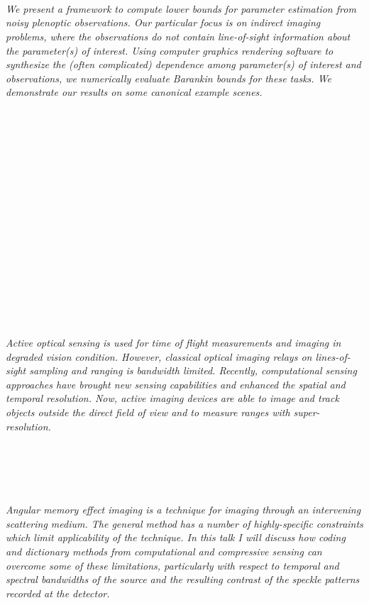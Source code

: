 \begin{multicols}{2}
        \\\\
\\
      \textit{We present a framework to compute lower bounds for parameter estimation from noisy plenoptic observations. Our particular focus is on indirect imaging problems, where the observations do not contain line-of-sight information about the parameter(s) of interest. Using computer graphics rendering software to synthesize the (often complicated) dependence among parameter(s) of interest and observations, we numerically evaluate Barankin bounds for these tasks.  We demonstrate our results on some canonical example scenes.}\\
\\ 
        \\
        \\\\
        \\
        \\\\
        \\
        \\\\
\\
      \textit{}\\
\\ 
        \\
        \\\\
\\
      \textit{Active optical sensing is used for time of flight measurements and imaging in degraded vision condition. However, classical optical imaging relays on lines-of-sight sampling and ranging is bandwidth limited. Recently, computational sensing approaches have brought new sensing capabilities and enhanced the spatial and temporal resolution. Now, active imaging devices are able to image and track objects outside the direct field of view and to measure ranges with super-resolution. }\\
\\ 
        \\
        \\\\
\\
      \textit{Angular memory effect imaging is a technique for imaging through an intervening scattering medium. The general method has a number of highly-specific constraints which limit applicability of the technique. In this talk I will discuss how coding and dictionary methods from computational and compressive sensing can overcome some of these limitations, particularly with respect to temporal and spectral bandwidths of the source and the resulting contrast of the speckle patterns recorded at the detector. }\\

\end{multicols}
